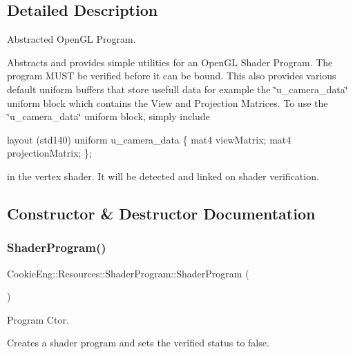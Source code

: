 \subsection{Detailed Description}
Abstracted Open\+GL Program. 

Abstracts and provides simple utilities for an Open\+GL Shader Program. The program M\+U\+ST be verified before it can be bound. This also provides various default uniform buffers that store usefull data for example the \char`\"{}u\+\_\+camera\+\_\+data\char`\"{} uniform block which contains the View and Projection Matrices. To use the \char`\"{}u\+\_\+camera\+\_\+data\char`\"{} uniform block, simply include

layout (std140) uniform u\+\_\+camera\+\_\+data \{ mat4 view\+Matrix; mat4 projection\+Matrix; \};

in the vertex shader. It will be detected and linked on shader verification. 

\subsection{Constructor \& Destructor Documentation}
\mbox{\label{class_cookie_eng_1_1_resources_1_1_shader_program_a2de1a879247aa4ee38fc2c37408c5285}} 
\subsubsection{\texorpdfstring{Shader\+Program()}{ShaderProgram()}}
{\footnotesize\ttfamily Cookie\+Eng\+::\+Resources\+::\+Shader\+Program\+::\+Shader\+Program (\begin{DoxyParamCaption}{ }\end{DoxyParamCaption})}



Program Ctor. 

Creates a shader program and sets the verified status to false. \mbox{\label{class_cookie_eng_1_1_resources_1_1_shader_program_a453b80b995d1b352c73fbac672d4dbc5}} 
